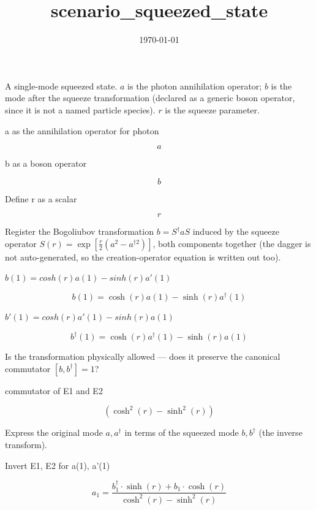 \documentclass[dvipdfmx]{article}
\title{scenario\_squeezed\_state}
\date{\today}
\begin{document}
\maketitle

A single-mode squeezed state. $a$ is the photon annihilation operator; $b$ is the mode after the squeeze transformation (declared as a generic boson operator, since it is not a named particle species). $r$ is the squeeze parameter.

a as the annihilation operator for photon

\[
  a
\]

b as a boson operator

\[
  b
\]

Define r as a scalar

\[
  r
\]

Register the Bogoliubov transformation $b=S^\dagger a S$ induced by the squeeze operator $S(r)=\exp[\frac{r}{2}(a^2-a^{\dagger 2})]$, both components together (the dagger is not auto-generated, so the creation-operator equation is written out too).

$b(1) = cosh(r) a(1) - sinh(r) a'(1)$

\begin{equation}
  b(1) = \cosh(r) a(1) - \sinh(r) a^{\dagger}(1)
  \label{eq:E1}
\end{equation}

$b'(1) = cosh(r) a'(1) - sinh(r) a(1)$

\begin{equation}
  b^{\dagger}(1) = \cosh(r) a^{\dagger}(1) - \sinh(r) a(1)
  \label{eq:E2}
\end{equation}

Is the transformation physically allowed — does it preserve the canonical commutator $[b,b^\dagger]=1$?

commutator of E1 and E2

\begin{equation}
  \left(\cosh^{2}\left( r \right) - \sinh^{2}\left( r \right)\right)
  \label{eq:E3}
\end{equation}

Express the original mode $a, a^\dagger$ in terms of the squeezed mode $b, b^\dagger$ (the inverse transform).

Invert E1, E2 for a(1), a'(1)

\begin{equation}
  a_{1} = \frac{b^{\dagger}_{1} \cdot \sinh\left( r \right) + b_{1} \cdot \cosh\left( r \right)}{\cosh^{2}\left( r \right) - \sinh^{2}\left( r \right)}
  \label{eq:E4}
\end{equation}
\end{document}
